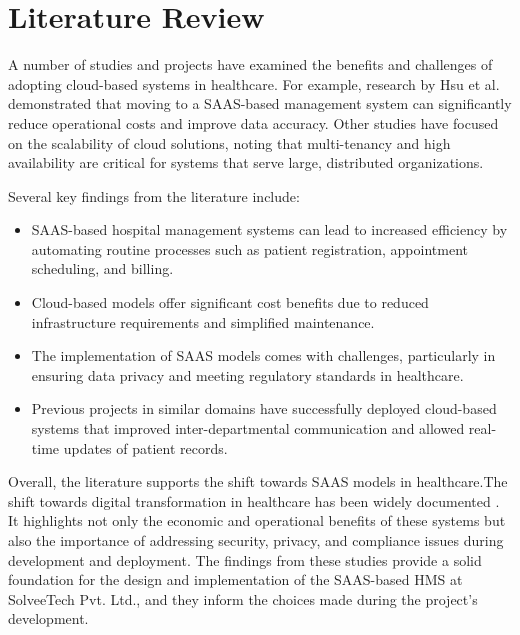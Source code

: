 \section{Literature Review}
A number of studies and projects have examined the benefits and challenges of adopting cloud-based systems in healthcare. For example, research by Hsu et al. demonstrated that moving to a SAAS-based management system can significantly reduce operational costs and improve data accuracy. Other studies have focused on the scalability of cloud solutions, noting that multi-tenancy and high availability are critical for systems that serve large, distributed organizations.

Several key findings from the literature include:
\begin{itemize}
  \item SAAS-based hospital management systems can lead to increased efficiency by automating routine processes such as patient registration, appointment scheduling, and billing.
  \item Cloud-based models offer significant cost benefits due to reduced infrastructure requirements and simplified maintenance.
  \item The implementation of SAAS models comes with challenges, particularly in ensuring data privacy and meeting regulatory standards in healthcare.
  \item Previous projects in similar domains have successfully deployed cloud-based systems that improved inter-departmental communication and allowed real-time updates of patient records.
\end{itemize}

Overall, the literature supports the shift towards SAAS models in healthcare.The shift towards digital transformation in healthcare has been widely documented \cite{doe2020digital, rahman2021saas}. It highlights not only the economic and operational benefits of these systems but also the importance of addressing security, privacy, and compliance issues during development and deployment. The findings from these studies provide a solid foundation for the design and implementation of the SAAS-based HMS at SolveeTech Pvt. Ltd., and they inform the choices made during the project’s development.
